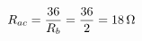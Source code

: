 \documentclass[preview]{standalone}
\begin{document}
\begin{align*}
\special{dvisvgm:raw <g id='unique000'>}R_{ac} = \frac{36}{R_b} = \frac{36}{2} = 18\,\Omega\special{dvisvgm:raw </g>}
\end{align*}
\end{document}
